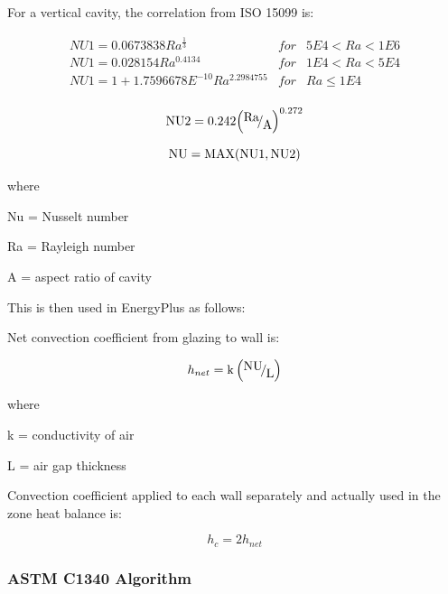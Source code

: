 For a vertical cavity, the correlation from ISO 15099 is:

\begin{equation}
\begin{array}{lcl}
    NU1 = 0.0673838 Ra^{\frac{1}{3}} & for &  5E4 < Ra < 1E6 \\
    NU1 = 0.028154 Ra^{0.4134} & for &  1E4 < Ra < 5E4 \\
    NU1 = 1 + 1.7596678E^{-10} Ra^{2.2984755} & for &  Ra \leq 1E4 \\
\end{array}
\end{equation}

\begin{equation}
{\rm{NU2}} = 0.242{\left( {{\raise0.7ex\hbox{{{\rm{Ra}}}} \!\mathord{\left/ {\vphantom {{{\rm{Ra}}} {\rm{A}}}}\right.}\!\lower0.7ex\hbox{{\rm{A}}}}} \right)^{0.272}}
\end{equation}

\begin{equation}
{\rm{NU = MAX(NU1,NU2)}}
\end{equation}

where

Nu = Nusselt number

Ra = Rayleigh number

A = aspect ratio of cavity

This is then used in EnergyPlus as follows:

Net convection coefficient from glazing to wall is:

\begin{equation}
{h_{net}} = {\rm{k}}\left( {{\raise0.7ex\hbox{{{\rm{NU}}}} \!\mathord{\left/ {\vphantom {{{\rm{NU}}} {\rm{L}}}}\right.}\!\lower0.7ex\hbox{{\rm{L}}}}} \right)
\end{equation}

where

k = conductivity of air

L = air gap thickness

Convection coefficient applied to each wall separately and actually used in the zone heat balance is:

\begin{equation}
{h_c} = 2{h_{net}}
\end{equation}

\subsubsection{ASTM C1340 Algorithm}\label{ASTM-C1340-algorithm}

